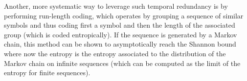 Another, more systematic way to leverage such temporal redundancy is by performing run-length coding, which operates by grouping a sequence of similar symbols and thus coding first a symbol and then the length of the associated group (which is coded entropically). If the sequence is generated by a Markov chain, this method can be shown to asymptotically reach the Shannon bound where now the entropy is the entropy associated to the distribution of the Markov chain on infinite sequences (which can be computed as the limit of the entropy for finite sequences).
